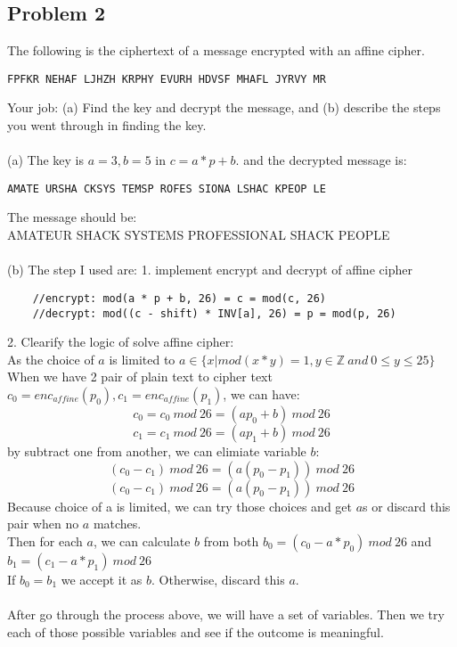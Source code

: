 \documentclass[paper=a4, fontsize=11pt]{scrartcl} %
\numberwithin{equation}{section} %
\numberwithin{figure}{section} %
\newcommand{\problem}[1]{\subsection *{Problem #1}}
\newcommand{\Z}{\mathbb{Z}}
\begin{document}
\problem 2 The following is the ciphertext of a message encrypted with an affine
cipher.
\begin{lstlisting}
FPFKR NEHAF LJHZH KRPHY EVURH HDVSF MHAFL JYRVY MR
\end{lstlisting}
Your job: (a) Find the key and decrypt the message, and (b) describe
the steps you went through in finding the key.\\\\
(a) The key is $a=3, b=5$ in $c=a*p+b$. and the decrypted message is:
\begin{lstlisting}
AMATE URSHA CKSYS TEMSP ROFES SIONA LSHAC KPEOP LE
\end{lstlisting}
The message should be:\\
AMATEUR SHACK SYSTEMS PROFESSIONAL SHACK PEOPLE\\
\\
(b) The step I used are:
1. implement encrypt and decrypt of affine cipher\\
\begin{lstlisting}
    //encrypt: mod(a * p + b, 26) = c = mod(c, 26)
    //decrypt: mod((c - shift) * INV[a], 26) = p = mod(p, 26)
\end{lstlisting}
2. Clearify the logic of solve affine cipher:\\
As the choice of $a$ is limited to $a \in \{ x| mod(x * y) = 1, y \in \Z \ and \ 0 \leq y \leq 25\}$\\
When we have 2 pair of plain text to cipher text $c_0 = enc_{affine}(p_0), c_1 = enc_{affine}(p_1)$, we can have:
$$ c_0 = c_0\ mod\ 26 = (ap_0+b)\ mod\ 26$$ 
$$ c_1 = c_1\ mod\ 26 = (ap_1+b)\ mod\ 26$$
by subtract one from another, we can elimiate variable $b$:\\
$$(c_0 - c_1)\ mod\ 26 = (a(p_0-p_1))\ mod\ 26$$
$$(c_0 - c_1)\ mod\ 26 = (a(p_0-p_1))\ mod\ 26$$
Because choice of a is limited, we can try those choices and get $a$s or discard this pair when no $a$ matches.\\
Then for each $a$, we can calculate $b$ from both $b_0= (c_0 - a*p_0)\ mod \ 26$ and $b_1= (c_1 - a*p_1)\ mod \ 26$\\
If $b_0 = b_1$ we accept it as $b$. Otherwise, discard this $a$.\\\\
After go through the process above, we will have a set of variables. Then we try each of those possible variables and see if the outcome is meaningful.\\
\end{document}

